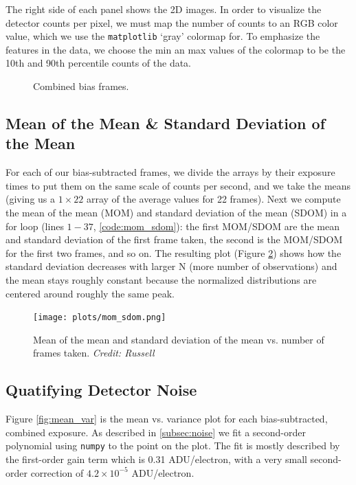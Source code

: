 \documentclass[preprint]{aastex62}
\begin{document}
The right side of each panel shows the 2D images. In order to visualize the detector counts per pixel, we must map the number of counts to an RGB color value, which we use the {\tt matplotlib} `gray' colormap for. To emphasize the features in the data, we choose the min an max values of the colormap to be the 10th and 90th percentile counts of the data.

\begin{figure}[H]
\caption{Combined bias frames.} \label{fig:bias}
\end{figure}

\subsection{Mean of the Mean \& Standard Deviation of the Mean}
For each of our bias-subtracted frames, we divide the arrays by their exposure times to put them on the same scale of counts per second, and we take the means (giving us a $1\times22$ array of the average values for 22 frames). Next we compute the mean of the mean (MOM) and standard deviation of the mean (SDOM) in a for loop (lines $1-37$, \ref{code:mom_sdom}): the first MOM/SDOM are the mean and standard deviation of the first frame taken, the second is the MOM/SDOM for the first two frames, and so on. The resulting plot (Figure \ref{fig:mom_sdom}) shows how the standard deviation decreases with larger N (more number of observations) and the mean stays roughly constant because the normalized distributions are centered around roughly the same peak.

\begin{figure}[H]
\begin{center}
\texttt{[image: plots/mom\_sdom.png]}
\caption{Mean of the mean and standard deviation of the mean vs. number of frames taken. \textit{Credit: Russell}} \label{fig:mom_sdom}
\end{center}
\end{figure}

\subsection{Quatifying Detector Noise} \label{subsec:gain}
Figure \ref{fig:mean_var} is the mean vs. variance plot for each bias-subtracted, combined exposure. As described in \ref{subsec:noise} we fit a second-order polynomial using {\tt numpy} to the point on the plot. The fit is mostly described by the first-order gain term which is 0.31 ADU/electron, with a very small second-order correction of $4.2\times10^{-5}$ ADU/electron.
\end{document}
